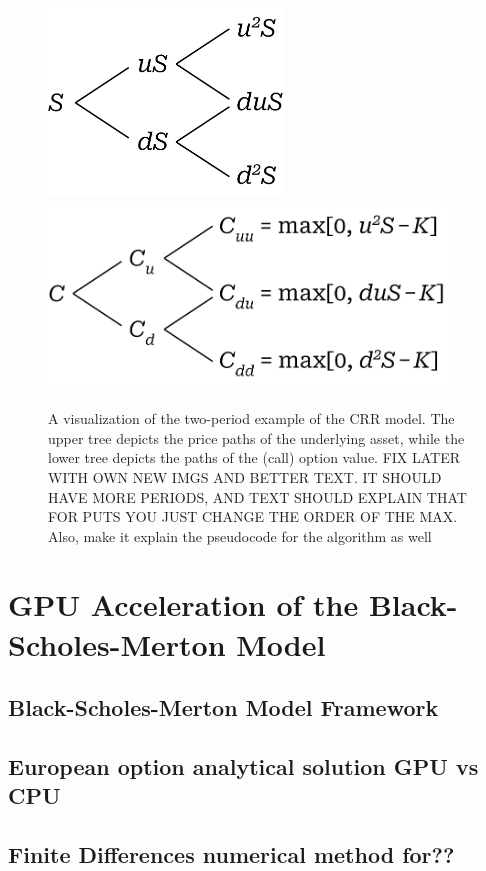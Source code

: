 \documentclass[english,12pt,a4paper,pdftex,sci,utf8]{aaltothesis}
\begin{document}
\begin{figure}[h]
    \centering
    \includegraphics[height=5cm]{two-period-stock.png}
    \hspace{2}
    \includegraphics[height=5cm]{two-period-option.png}
    \caption{A visualization of the two-period example of the CRR model. The upper tree depicts the price paths of the underlying asset, while the lower tree depicts the paths of the (call) option value. FIX LATER WITH OWN NEW IMGS AND BETTER TEXT. IT SHOULD HAVE MORE PERIODS, AND TEXT SHOULD EXPLAIN THAT FOR PUTS YOU JUST CHANGE THE ORDER OF THE MAX. Also, make it explain the pseudocode for the algorithm as well}
    \label{fig:combined}
\end{figure}



\section{GPU Acceleration of the Black-Scholes-Merton Model} \label{sec:gpu-bsm}
\subsection{Black-Scholes-Merton Model Framework}
\subsection{European option analytical solution GPU vs CPU}
\subsection{Finite Differences numerical method for??}
\end{document}
